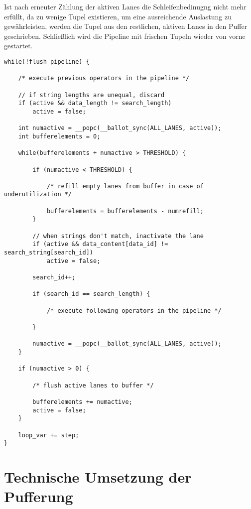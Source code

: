 Ist nach erneuter Zählung der aktiven Lanes die Schleifenbedinugng nicht mehr erfüllt, da zu wenige Tupel existieren, um eine ausreichende Auslastung zu gewährleisten, werden die Tupel aus den restlichen, aktiven Lanes in den Puffer geschrieben.
Schließlich wird die Pipeline mit frischen Tupeln wieder von vorne gestartet.

\newpage

\begin{lstlisting}[language=MyC++,
caption=Struktur der String-Selektion mit Lane Refill,
label=equals_lane_refill_code]
while(!flush_pipeline) {

	/* execute previous operators in the pipeline */
	
	// if string lengths are unequal, discard
	if (active && data_length != search_length)
		active = false;
	
	int numactive = __popc(__ballot_sync(ALL_LANES, active));
	int bufferelements = 0;
	
	while(bufferelements + numactive > THRESHOLD) {
	
		if (numactive < THRESHOLD) {
		
			/* refill empty lanes from buffer in case of underutilization */
			
			bufferelements = bufferelements - numrefill;
		}
		
		// when strings don't match, inactivate the lane
		if (active && data_content[data_id] != search_string[search_id])
			active = false;
		
		search_id++;
		
		if (search_id == search_length) {
		
			/* execute following operators in the pipeline */
		
		}
		
		numactive = __popc(__ballot_sync(ALL_LANES, active));
	}
		
	if (numactive > 0) {
	
		/* flush active lanes to buffer */
		
		bufferelements += numactive;
		active = false;
	}
	
	loop_var += step;
}
\end{lstlisting}

\section{Technische Umsetzung der Pufferung}

